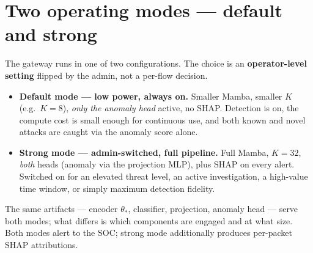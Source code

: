 \documentclass[11pt,a4paper]{article}
\begin{document}
\section{Two operating modes --- default and strong}

The gateway runs in one of two configurations. The choice is an \textbf{operator-level setting} flipped by the admin, not a per-flow decision.

\begin{itemize}[leftmargin=*, itemsep=2pt]
  \item \textbf{Default mode --- low power, always on.} Smaller Mamba, smaller $K$ (e.g.\ $K=8$), \emph{only the anomaly head} active, no SHAP. Detection is on, the compute cost is small enough for continuous use, and both known and novel attacks are caught via the anomaly score alone.
  \item \textbf{Strong mode --- admin-switched, full pipeline.} Full Mamba, $K=32$, \emph{both} heads (anomaly via the projection MLP), plus SHAP on every alert. Switched on for an elevated threat level, an active investigation, a high-value time window, or simply maximum detection fidelity.
\end{itemize}

The same artifacts --- encoder $\theta_*$, classifier, projection, anomaly head --- serve both modes; what differs is which components are engaged and at what size. Both modes alert to the SOC; strong mode additionally produces per-packet SHAP attributions.
\end{document}
